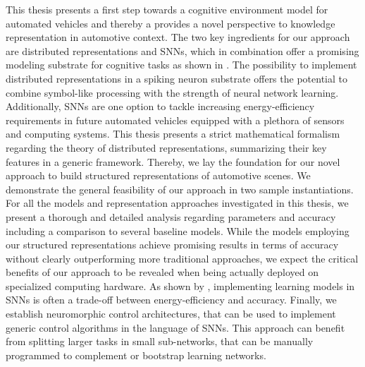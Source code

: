 This thesis presents a first step towards a cognitive environment model for automated vehicles and thereby a provides a novel perspective to knowledge representation in automotive context.
The two key ingredients for our approach are distributed representations and \acp{SNN}, which in combination offer a promising modeling substrate for cognitive tasks as shown in \textcite{Eliasmith2013, Eliasmith2012}. 
The possibility to implement distributed representations in a spiking neuron substrate offers the potential to combine symbol-like processing with the strength of neural network learning.
Additionally, \acp{SNN} are one option to tackle increasing energy-efficiency requirements in future automated vehicles equipped with a plethora of sensors and computing systems.
This thesis presents a strict mathematical formalism regarding the theory of distributed representations, summarizing their key features in a generic framework.
Thereby, we lay the foundation for our novel approach to build structured representations of automotive scenes.
We demonstrate the general feasibility of our approach in two sample instantiations.
For all the models and representation approaches investigated in this thesis, we present a thorough and detailed analysis regarding parameters and accuracy including a comparison to several baseline models.
While the models employing our structured representations achieve promising results in terms of accuracy without clearly outperforming more traditional approaches, we expect the critical benefits of our approach to be revealed when being actually deployed on specialized computing hardware. 
As shown by \textcite{Hunsberger2016}, implementing learning models in \acp{SNN} is often a trade-off between energy-efficiency and accuracy.
Finally, we establish neuromorphic control architectures, that can be used to implement generic control algorithms in the language of \acp{SNN}.
This approach can benefit from splitting larger tasks in small sub-networks, that can be manually programmed to complement or bootstrap learning networks.

